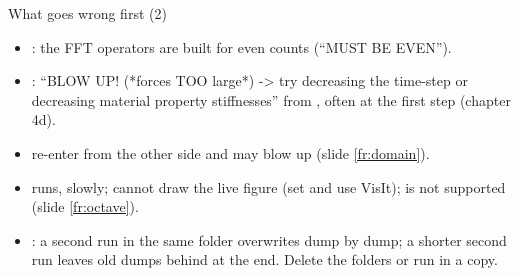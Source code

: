 \documentclass[aspectratio=169,11pt]{beamer}
\begin{document}
\begin{frame}{What goes wrong first (2)}
\label{fr:pitfalls2}
\footnotesize
\begin{itemize}
  \item {}: the FFT operators are built for even counts (``MUST BE EVEN'').
  \item {}: ``BLOW UP! (*forces TOO large*) -> try decreasing the time-step or decreasing material property stiffnesses'' from , often at the first step (chapter 4d).
  \item {} re-enter from the other side and may blow up (slide \ref{fr:domain}).
  \item {} runs, slowly;  cannot draw the live figure (set  and use VisIt);  is not supported (slide \ref{fr:octave}).
  \item {}: a second run in the same folder overwrites  dump by dump; a shorter second run leaves old dumps behind at the end. Delete the folders or run in a copy.
\end{itemize}
\end{frame}
\end{document}
